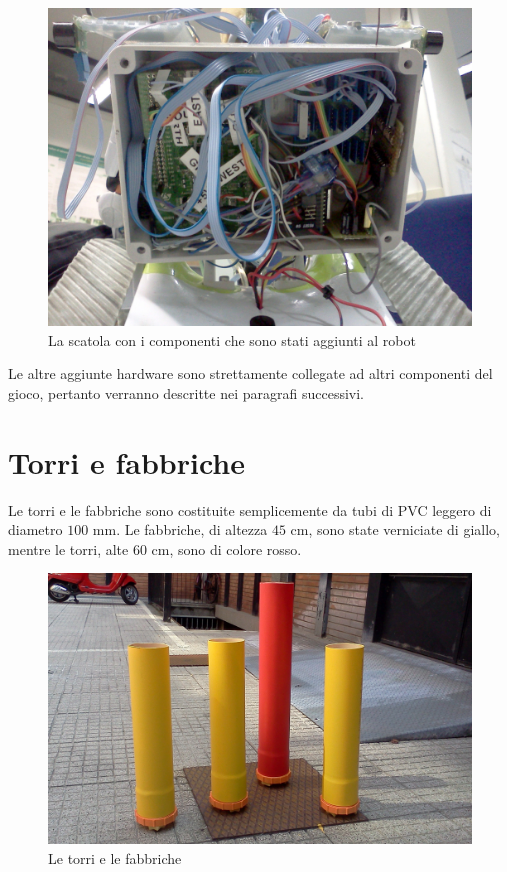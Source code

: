 \begin{figure}[h]
\centering
\includegraphics[scale=0.15]{images/scatola}
\caption{La scatola con i componenti che sono stati aggiunti al robot}
\end{figure}

\noindent Le altre aggiunte hardware sono strettamente collegate ad altri componenti del gioco, pertanto verranno descritte nei paragrafi successivi.

\section{Torri e fabbriche}

Le torri e le fabbriche sono costituite semplicemente da tubi di PVC leggero di diametro $100$ mm. Le fabbriche, di altezza $45$ cm, sono state verniciate di giallo, mentre le torri, alte $60$ cm, sono di colore rosso.

\begin{figure}[h]
\centering
\includegraphics[scale=0.18]{images/torri}
\caption{Le torri e le fabbriche}
\end{figure}


